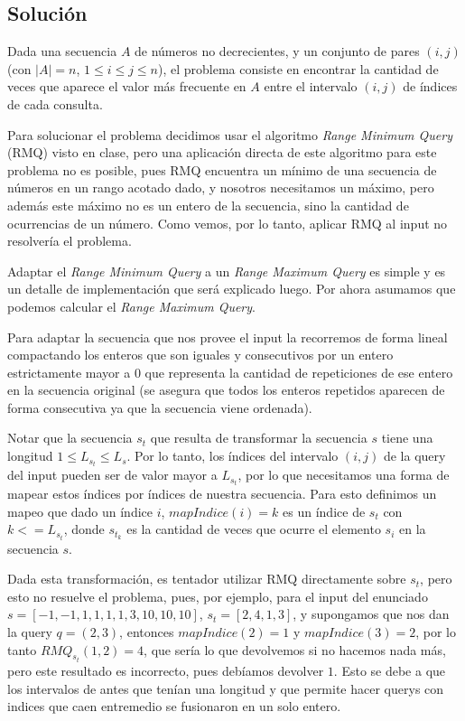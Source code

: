 \subsection*{Solución}

Dada una secuencia $A$ de números no decrecientes, y un conjunto de pares $(i,j)$
(con $|A|=n$, $1 \le i \le j \le n$), el problema consiste en encontrar la
cantidad de veces que aparece el valor más frecuente en $A$ entre el intervalo
$(i,j)$ de índices de cada consulta.

Para solucionar el problema decidimos usar el algoritmo {\sl Range Minimum Query}
(RMQ) visto en clase, pero una aplicación directa de este algoritmo para este problema
no es posible, pues RMQ encuentra un mínimo de una secuencia de números en un rango
acotado dado, y nosotros necesitamos un máximo, pero además este máximo no es
un entero de la secuencia, sino la cantidad de ocurrencias de un número.
Como vemos, por lo tanto, aplicar RMQ al input no resolvería el problema.

Adaptar el {\sl Range Minimum Query} a un {\sl Range Maximum Query} es simple
y es un detalle de implementación que será explicado luego. Por ahora asumamos
que podemos calcular el {\sl Range Maximum Query}.

Para adaptar la secuencia que nos provee el input la recorremos de forma
lineal compactando los enteros que son iguales y consecutivos por un entero
estrictamente mayor a $0$ que representa la cantidad de repeticiones de ese
entero en la secuencia original (se asegura que todos los enteros repetidos
aparecen de forma consecutiva ya que la secuencia viene ordenada).

Notar que la secuencia $s_t$ que resulta de transformar la secuencia $s$ tiene
una longitud $1 \le L_{s_t} \le L_s$. Por lo tanto, los índices del intervalo $(i,j)$
de la query del input pueden ser de valor mayor a $L_{s_t}$, por lo que necesitamos
una forma de mapear estos índices por índices de nuestra secuencia. Para esto
definimos un mapeo que dado un índice $i$, $mapIndice(i) = k$ es un índice de $s_t$
con $k <= L_{s_t}$, donde $s_{t_k}$ es la cantidad de veces que ocurre el elemento
$s_i$ en la secuencia $s$.

Dada esta transformación, es tentador utilizar RMQ directamente sobre $s_t$, pero
esto no resuelve el problema, pues, por ejemplo, para el input del enunciado
$s = [-1, -1, 1, 1, 1, 1, 3, 10, 10, 10]$, $s_t = [2, 4, 1, 3]$, y supongamos
que nos dan la query $q = (2, 3)$, entonces $mapIndice(2) = 1$ y $mapIndice(3) = 2$,
por lo tanto $RMQ_{s_t}(1,2) = 4$, que sería lo que devolvemos si no hacemos nada más,
pero este resultado es incorrecto, pues debíamos devolver $1$. Esto se debe a que
los intervalos de antes que tenían una longitud y que permite hacer querys con indices
que caen entremedio se fusionaron en un solo entero.

